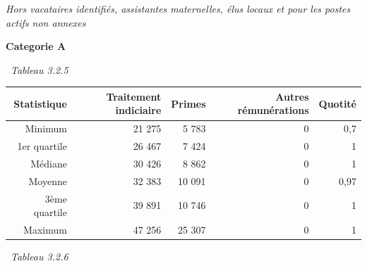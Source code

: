 \emph{Hors vacataires identifiés, assistantes maternelles, élus locaux
et pour les postes actifs non annexes}

\textbf{Categorie A}

~\emph{Tableau 3.2.5}

\begin{longtable}[]{@{}rrrrr@{}}
\toprule
Statistique & Traitement indiciaire & Primes & Autres rémunérations &
Quotité\tabularnewline
\midrule
\endhead
Minimum & 21 275 & 5 783 & 0 & 0,7\tabularnewline
1er quartile & 26 467 & 7 424 & 0 & 1\tabularnewline
Médiane & 30 426 & 8 862 & 0 & 1\tabularnewline
Moyenne & 32 383 & 10 091 & 0 & 0,97\tabularnewline
3ème quartile & 39 891 & 10 746 & 0 & 1\tabularnewline
Maximum & 47 256 & 25 307 & 0 & 1\tabularnewline
\bottomrule
\end{longtable}

~\emph{Tableau 3.2.6}

